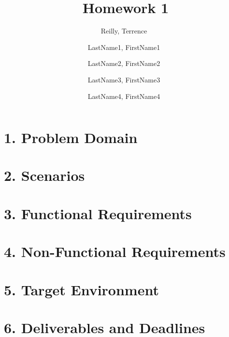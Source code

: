 \documentclass[a4paper,12pt]{article}
\author{
    Reilly, Terrence\
    \and
    LastName1, FirstName1\
    \and
    LastName2, FirstName2\
    \and
    LastName3, FirstName3\
    \and
    LastName4, FirstName4\
}
\title{Homework 1}
\begin{document}
    \maketitle

    \section*{1. Problem Domain}
        

    \section*{2. Scenarios}
        

    \section*{3. Functional Requirements}
        

    \section*{4. Non-Functional Requirements}
        

    \section*{5. Target Environment}
        

    \section*{6. Deliverables and Deadlines}
        
\end{document}
